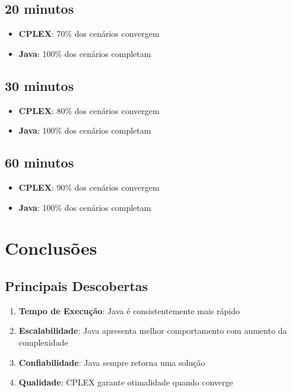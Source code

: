 \documentclass[12pt,a4paper]{article}
\begin{document}
\subsection{20 minutos}

\begin{itemize}
    \item \textbf{CPLEX}: 70\% dos cenários convergem
    \item \textbf{Java}: 100\% dos cenários completam
\end{itemize}

\subsection{30 minutos}

\begin{itemize}
    \item \textbf{CPLEX}: 80\% dos cenários convergem
    \item \textbf{Java}: 100\% dos cenários completam
\end{itemize}

\subsection{60 minutos}

\begin{itemize}
    \item \textbf{CPLEX}: 90\% dos cenários convergem
    \item \textbf{Java}: 100\% dos cenários completam
\end{itemize}

\section{Conclusões}

\subsection{Principais Descobertas}

\begin{enumerate}
    \item \textbf{Tempo de Execução}: Java é consistentemente mais rápido
    \item \textbf{Escalabilidade}: Java apresenta melhor comportamento com aumento da complexidade
    \item \textbf{Confiabilidade}: Java sempre retorna uma solução
    \item \textbf{Qualidade}: CPLEX garante otimalidade quando converge
\end{enumerate}
\end{document}
